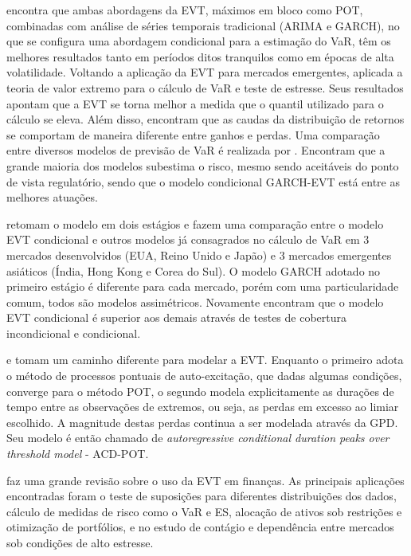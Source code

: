 \documentclass[review]{elsarticle}
\theoremstyle{definition}
\begin{document}
\cite{Bystroem2004} encontra que ambas abordagens da EVT, máximos em bloco como POT, combinadas com análise de séries temporais tradicional (ARIMA e GARCH), no que se configura uma abordagem condicional para a estimação do VaR, têm os melhores resultados tanto em períodos ditos tranquilos como em épocas de alta volatilidade. Voltando a aplicação da EVT para mercados emergentes, \cite{Gencay2004} aplicada a teoria de valor extremo para o cálculo de VaR e teste de estresse. Seus resultados apontam que a EVT se torna melhor a medida que o quantil utilizado para o cálculo se eleva. Além disso, encontram que as caudas da distribuição de retornos se comportam de maneira diferente entre ganhos e perdas. Uma comparação entre diversos modelos de previsão de VaR é realizada por \cite{Kuester2006}. Encontram que a grande maioria dos modelos subestima o risco, mesmo sendo aceitáveis do ponto de vista regulatório, sendo que o modelo condicional GARCH-EVT está entre as melhores atuações.


\cite{Karmakar2014} retomam o modelo em dois estágios e fazem uma comparação entre o modelo EVT condicional e outros modelos já consagrados no cálculo de VaR em 3 mercados desenvolvidos (EUA, Reino Unido e Japão) e 3 mercados emergentes asiáticos (Índia, Hong Kong e Corea do Sul). O modelo GARCH adotado no primeiro estágio é diferente para cada mercado, porém com uma particularidade comum, todos são modelos assimétricos. Novamente encontram que o modelo EVT condicional é superior aos demais através de testes de cobertura incondicional e condicional.

\cite{Chavez-Demoulin2005} e \cite{Herrera2013} tomam um caminho diferente para modelar a EVT. Enquanto o primeiro adota o método de processos pontuais de auto-excitação, que dadas algumas condições, converge para o método POT, o segundo modela explicitamente as durações de tempo entre as observações de extremos, ou seja, as perdas em excesso ao limiar escolhido. A magnitude destas perdas continua a ser modelada através da GPD. Seu modelo é então chamado de \emph{autoregressive conditional duration peaks over threshold model} - ACD-POT.

\cite{Rocco2014} faz uma grande revisão sobre o uso da EVT em finanças. As principais aplicações encontradas  foram o teste de suposições para diferentes distribuições dos dados, cálculo de medidas de risco como o VaR e ES, alocação de ativos sob restrições e otimização de portfólios, e no estudo de contágio e dependência entre mercados sob condições de alto estresse.
\end{document}
